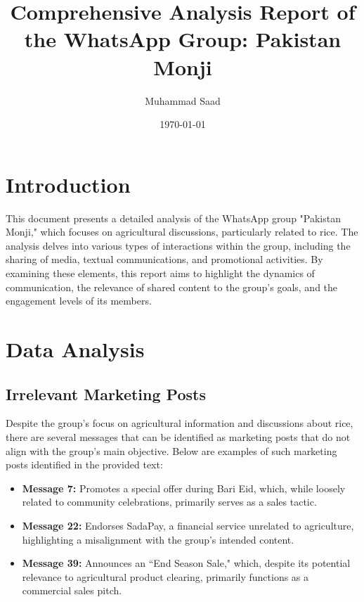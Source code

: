 \documentclass[12pt]{article}
\title{Comprehensive Analysis Report of the WhatsApp Group: Pakistan Monji}
\author{Muhammad Saad}
\date{\today}
\begin{document}
\maketitle

\section{Introduction}
This document presents a detailed analysis of the WhatsApp group "Pakistan Monji," which focuses on agricultural discussions, particularly related to rice. The analysis delves into various types of interactions within the group, including the sharing of media, textual communications, and promotional activities. By examining these elements, this report aims to highlight the dynamics of communication, the relevance of shared content to the group's goals, and the engagement levels of its members.


\section{Data Analysis}
\subsection{Irrelevant Marketing Posts}
Despite the group's focus on agricultural information and discussions about rice, there are several messages that can be identified as marketing posts that do not align with the group’s main objective. Below are examples of such marketing posts identified in the provided text:

\begin{itemize}
\item \textbf{Message 7:} Promotes a special offer during Bari Eid, which, while loosely related to community celebrations, primarily serves as a sales tactic.
\item \textbf{Message 22:} Endorses SadaPay, a financial service unrelated to agriculture, highlighting a misalignment with the group's intended content.
\item \textbf{Message 39:} Announces an ``End Season Sale," which, despite its potential relevance to agricultural product clearing, primarily functions as a commercial sales pitch.
\end{itemize}
\end{document}
